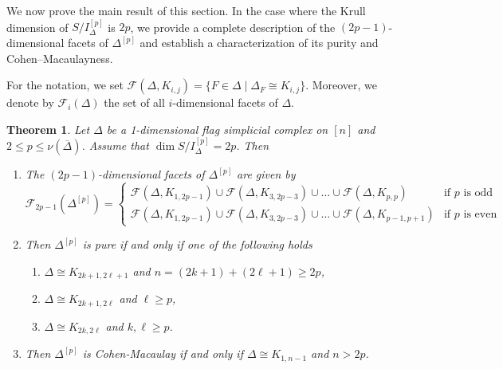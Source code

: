 \documentclass[12pt]{amsart}
\let\iso=\cong
\newtheorem{Theorem}{Theorem}[section]
\begin{document}
We now prove the main result of this section. In the case where the Krull dimension of $S/I_{\Delta}^{[p]}$ is $2p$, we provide a complete description of the $(2p-1)$-dimensional facets of $\Delta^{[p]}$ and establish a characterization of its purity and Cohen--Macaulayness. 

For the notation, we set $\mathcal{F}(\Delta, K_{i,j})=\{ F \in \Delta \mid \Delta_F \cong K_{i,j}\}$. Moreover, we denote by $\mathcal{F}_i(\Delta)$ the set of all $i$-dimensional facets of $\Delta$.


\begin{Theorem}\label{Thm: Facet, pure, CM}
    Let $\Delta$ be a 1-dimensional flag simplicial complex on $[n]$ and $2\leq p\leq \nu(\overline{\Delta})$. Assume that $\dim S/I_{\Delta}^{[p]}=2p$. Then
    \begin{enumerate}
   \item The $(2p-1)$-dimensional facets of $\Delta^{[p]}$ are given by 
   \[
   \mathcal{F}_{2p-1}(\Delta^{[p]})= 
   \begin{cases} 
       \mathcal{F}( \Delta, K_{1,2p-1}) \cup \mathcal{F}( \Delta, K_{3,2p-3}) \cup \ldots \cup \mathcal{F}( \Delta, K_{p,p}) & \text{if } p \text{ is odd } \\
     \mathcal{F}( \Delta, K_{1,2p-1}) \cup \mathcal{F}( \Delta, K_{3,2p-3}) \cup \ldots \cup \mathcal{F}( \Delta, K_{p-1,p+1})   & \text{if } p \text{ is even}
   \end{cases}
\]
   
   \item Then $\Delta^{[p]}$ is pure if and only if one of the following holds
     \begin{enumerate}
       \item[(i)] $\Delta \iso K_{2k+1,2\ell+1}$ and $n=(2k+1)+(2\ell+1)\ge 2p$,
       \item[(ii)] $\Delta \iso K_{2k+1,2\ell}$ and $\ell \geq p$,
        \item[(iii)] $\Delta \iso K_{2k,2\ell}$ and $k,\ell \geq p$.
    \end{enumerate}

\item Then  $\Delta^{[p]}$ is Cohen-Macaulay if and only if $\Delta \iso K_{1,n-1}$ and $n>2p$.
    \end{enumerate}
\end{Theorem}
\end{document}

